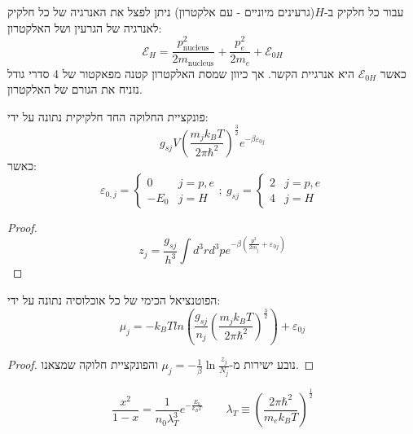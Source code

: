 \documentclass{tstextbook}
\begin{document}
\begin{proposition}
עבור כל חלקיק ב-\(H\)(גרעינים מיוניים - עם אלקטרון) ניתן לפצל את האנרגיה של כל חלקיק לאנרגיה של הגרעין ושל האלקטרון:
$$\mathcal{E} _{H}=\frac{p^{2}_{\text{nucleus}}}{2m_{\text{nucleus}}}+\frac{p^{2}_{e}}{2m_{e}}+\mathcal{E} _{0H}$$
כאשר \(\mathcal{E}_{0H}\) היא אנרגיית הקשר. אך כיוון שמסת האלקטרון קטנה מפאקטור של 4 סדרי גודל נזניח את הגורם של האלקטרון.

\end{proposition}
\begin{corollary}
פונקציית החלוקה החד חלקיקית נתונה על ידי:
$$g_{s j}V\left(\frac{m_{j}k_{B}T}{2\pi\hbar^{2}}\right)^{\frac{3}{2}}e^{-\beta\varepsilon_{0j}}$$
כאשר:
$$\varepsilon_{0,j}=\begin{cases}0&j=p,e\\ -E_{0}&j=H\end{cases};\ g_{s j}=\begin{cases}2&j=p,e\\ 4&j=H\end{cases}$$

\end{corollary}
\begin{proof}
$$z_{j}=\frac{g_{s j}}{h^{3}}\int d^{3}r d^{3}p e^{-\beta\left(\frac{p^{2}}{2m_{j}}+\varepsilon_{0j}\right)}$$

\end{proof}
\begin{corollary}
הפוטנציאל הכימי של כל אוכלוסיה נתונה על ידי:
$$\mu_{j}=-k_{B}T l n\left(\frac{g_{s j}}{n_{j}}\left(\frac{m_{j}k_{B}T}{2\pi\hbar^{2}}\right)^{\frac{3}{2}}\right)+\varepsilon_{0j}$$

\end{corollary}
\begin{proof}
נובע ישירות מ-\(\mu_{j}=-\frac{1}{\beta}\ln \frac{z_{j}}{N_{j}}\) והפונקציית חלוקה שמצאנו.

\end{proof}
\begin{proposition}
$$\frac{x^{2}}{1-x}=\frac{1}{n_{0}\lambda_{T}^{3}}e^{-\frac{E_{0}}{k_{B}T}}\qquad \lambda_{T}\equiv\left(\frac{2\pi\hbar^{2}}{m_{e}k_{B}T}\right)^{\frac{1}{2}}$$

\end{proposition}
\end{document}
